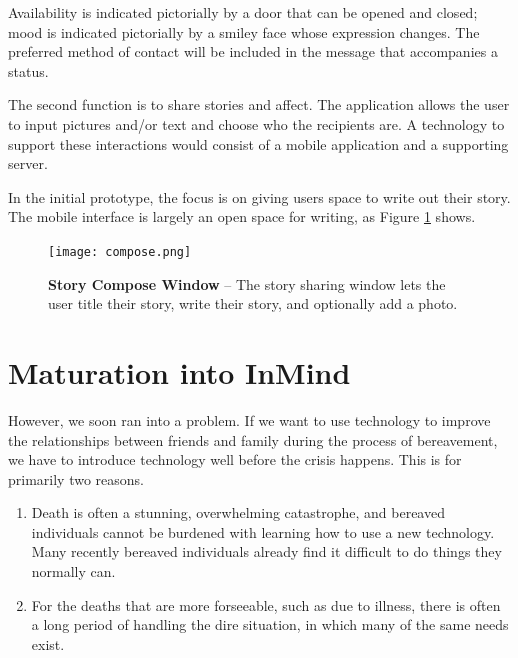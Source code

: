 Availability is indicated pictorially by a door that can be opened and closed;
mood is indicated pictorially by a smiley face whose expression changes.
The preferred method of contact will be included in the message that
accompanies a status.

The second function is to share stories and affect.
The application allows the user to input pictures and/or text and
choose who the recipients are.
A technology to support these interactions would consist of a mobile
application and a supporting server. 

In the initial prototype, the focus is on giving users space to write out
their story.
The mobile interface is largely an open space for writing,
as Figure \ref{fig:compose} shows.

\begin{figure}
\caption[InMourning Story Compose]{\textbf{Story Compose Window} --
The story sharing window lets the user title their story,
write their story,
and optionally add a photo.}
\centering
\texttt{[image: compose.png]}
\label{fig:compose}
\end{figure}

\section{Maturation into InMind}
  However, we soon ran into a problem.
  If we want to use technology to improve the relationships between friends and family during the
  process of bereavement, we have to introduce technology well before the crisis happens.
  This is for primarily two reasons.
  \begin{enumerate}
  \item Death is often a stunning, overwhelming catastrophe,
  and bereaved individuals cannot be burdened with learning how to use a new technology.
  Many recently bereaved individuals already find it difficult to do things they normally can. \cite{parkes13}
  \item For the deaths that are more forseeable, such as due to illness,
  there is often a long period of handling the dire situation,
  in which many of the same needs exist.
  \end{enumerate}

\clearpage
\newpage
